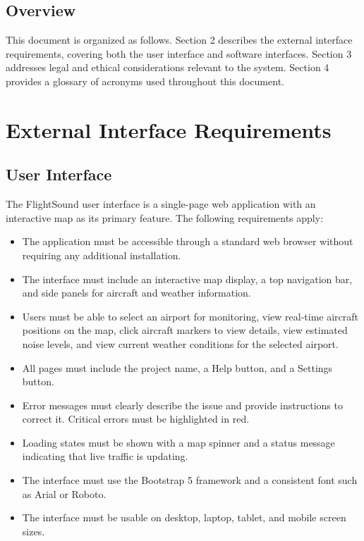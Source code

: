 \documentclass[12pt]{article}
\begin{document}
\subsection{Overview}
This document is organized as follows. Section 2 describes the external interface requirements, covering both the user interface and software interfaces. Section 3 addresses legal and ethical considerations relevant to the system. Section 4 provides a glossary of acronyms used throughout this document.

\newpage

\section{External Interface Requirements}

\subsection{User Interface}
The FlightSound user interface is a single-page web application with an interactive map as its primary feature. The following requirements apply:

\begin{itemize}
\item The application must be accessible through a standard web browser without requiring any additional installation.
\item The interface must include an interactive map display, a top navigation bar, and side panels for aircraft and weather information.
\item Users must be able to select an airport for monitoring, view real-time aircraft positions on the map, click aircraft markers to view details, view estimated noise levels, and view current weather conditions for the selected airport.
\item All pages must include the project name, a Help button, and a Settings button.
\item Error messages must clearly describe the issue and provide instructions to correct it. Critical errors must be highlighted in red.
\item Loading states must be shown with a map spinner and a status message indicating that live traffic is updating.
\item The interface must use the Bootstrap 5 framework and a consistent font such as Arial or Roboto.
\item The interface must be usable on desktop, laptop, tablet, and mobile screen sizes.
\end{itemize}
\end{document}

